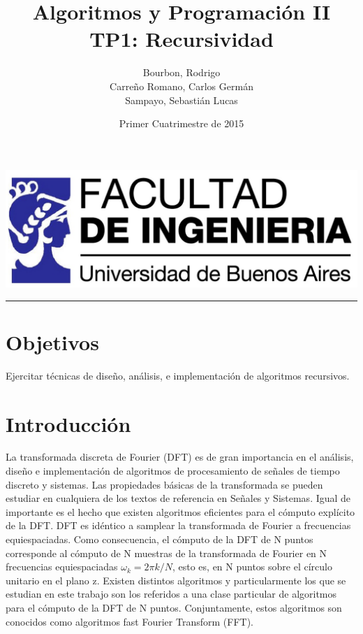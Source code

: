 \documentclass{article}
\begin{document}
\title{Algoritmos y Programación II\\
       TP1: Recursividad}
\author{Bourbon, Rodrigo\\
        Carreño Romano, Carlos Germán\\
        Sampayo, Sebastián Lucas}
\date{Primer Cuatrimestre de 2015}
\maketitle

\begin{center}
  \includegraphics[width=0.5\paperwidth]{Imagenes/logo_fiuba_HD}
  \rule[0.5ex]{0.8\paperwidth}{0.1pt}
\par
\end{center}



\newpage{}
\vfill{}
\tableofcontents{}
\vfill{}
\newpage{}


\section{Objetivos}
  Ejercitar técnicas de diseño, análisis, e implementación de algoritmos recursivos.

\section{Introducción}
La transformada discreta de Fourier (DFT) es de gran importancia en el análisis, diseño e implementación de algoritmos de procesamiento de señales de tiempo discreto y sistemas. Las propiedades básicas de la transformada se pueden estudiar en cualquiera de los textos de referencia en Señales y Sistemas. Igual de importante es el hecho que existen algoritmos eficientes para el cómputo explícito de la DFT.  DFT es idéntico a samplear la transformada de Fourier a frecuencias equiespaciadas. Como consecuencia, el cómputo de la DFT de N puntos corresponde al cómputo de N muestras de la transformada de Fourier en N frecuencias equiespaciadas $\omega_k=2\pi k/N$, esto es, en N puntos sobre el círculo unitario en el plano z. Existen distintos algoritmos y particularmente los que se estudian en este trabajo son los referidos a una clase particular de algoritmos para el cómputo de la DFT de N puntos. Conjuntamente, estos algoritmos son conocidos como algoritmos fast Fourier Transform (FFT).
\end{document}
